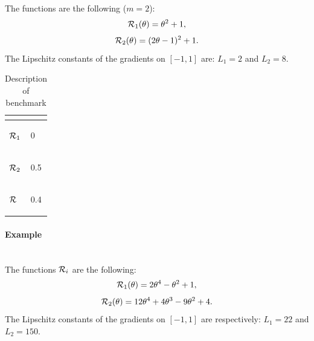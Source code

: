 The functions are the following ($m=2$):
\begin{equation*}
	\mathcal{R}_1(\theta) = \theta^2+1,
\end{equation*}
\begin{equation*}
	\mathcal{R}_2(\theta) = (2\theta-1)^2+1.
\end{equation*}
The Lipschitz constants of the gradients on $[-1,1]$ are: $L_1=2$ and $L_2=8$.

\begin{table}[h!]
	\centering
	\caption{Description of benchmark \exOne}
	\begin{tabular}{ll}
		
		\toprule
		\begin{bf} \diagbox{Functions}{Minimums} \end{bf} & \begin{bf}\mg\end{bf} \\ \midrule
		
		\begin{bf}$\mathcal{R}_1$\end{bf} &  0   \\ \midrule
		\begin{bf}$\mathcal{R}_2$\end{bf} &  0.5 \\ \midrule
		\begin{bf}$\mathcal{R}$\end{bf}   &  0.4 \\ \bottomrule
	\end{tabular}
	\label{ex1_example}
\end{table}

\paragraph{Example \exTwo}
~~\\
The functions $\mathcal{R}_i$ are the following:
\begin{equation*}
	\mathcal{R}_1(\theta) = 2\theta^4-\theta^2+1,
\end{equation*}
\begin{equation*}
	\mathcal{R}_2(\theta) = 12\theta^4+4\theta^3-9\theta^2+4.
\end{equation*}
The Lipschitz constants of the gradients on $[-1,1]$ are respectively: $L_1=22$ and $L_2=150$.

